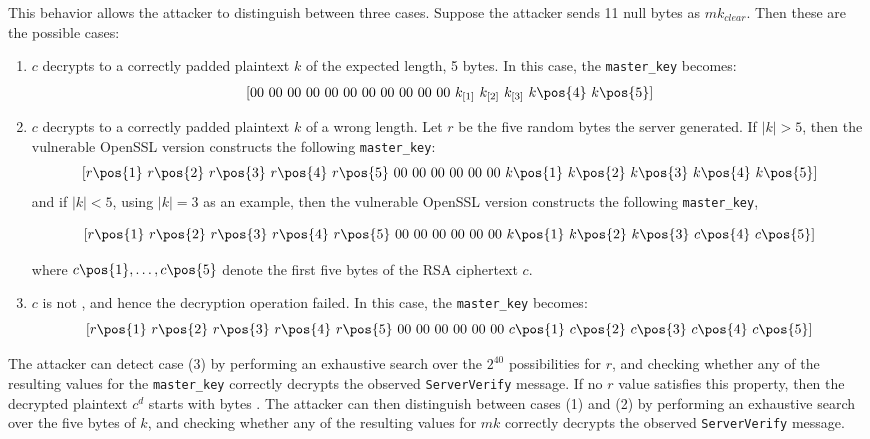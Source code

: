 This behavior allows the attacker to distinguish between three cases.
Suppose the attacker sends 11 null bytes as $mk_{clear}$.
Then these are the possible cases:
\begin{enumerate}
	\item $c$ decrypts to a correctly padded plaintext $k$ of the expected length, 5 bytes.
		In this case, the \texttt{master\_key} becomes:
		$$[00\ 00\ 00\ 00\ 00\ 00\ 00\ 00\ 00\ 00\ 00\ k_{[1]}\ k_{[2]}\ k_{[3]}\ k\pos{4}\ k\pos{5}]$$
	\item $c$ decrypts to a correctly padded plaintext $k$ of a wrong length.
		Let $r$ be the five random bytes the server generated.
		If $|k| > 5$,
		then the vulnerable OpenSSL version constructs the following \texttt{master\_key}:
		$$[r\pos{1}\ r\pos{2}\ r\pos{3}\ r\pos{4}\ r\pos{5}\ 00\ 00\ 00\ 00\ 00\ 00\ k\pos{1}\ k\pos{2}\ k\pos{3}\ k\pos{4}\ k\pos{5}]$$
		and if $|k| < 5$, using $|k| = 3$ as an example,
		then the vulnerable OpenSSL version constructs the following \texttt{master\_key},


		$$[r\pos{1}\ r\pos{2}\ r\pos{3}\ r\pos{4}\ r\pos{5}\ 00\ 00\ 00\ 00\ 00\ 00\ k\pos{1}\ k\pos{2}\ k\pos{3}\ c\pos{4}\ c\pos{5}]$$

		where $c\pos{1}, \ldots, c\pos{5}$ denote the first five bytes of the RSA ciphertext $c$.
	\item $c$ is not \sslconform,
		and hence the decryption operation failed. In this case, the \texttt{master\_key} becomes:
		$$[r\pos{1}\ r\pos{2}\ r\pos{3}\ r\pos{4}\ r\pos{5}\ 00\ 00\ 00\ 00\ 00\ 00\ c\pos{1}\ c\pos{2}\ c\pos{3}\ c\pos{4}\ c\pos{5}]$$
\end{enumerate}

The attacker can detect case (3) by performing an exhaustive search over the $2^{40}$ possibilities for $r$,
and checking whether any of the resulting values for the \texttt{master\_key} correctly 
decrypts the observed \texttt{ServerVerify} message.
If no $r$ value satisfies this property, then
the decrypted plaintext $c^d$ starts with bytes .
The attacker can then distinguish between cases (1) and (2) by 
performing an exhaustive search over the five bytes of $k$,
and checking whether any of the resulting values for $mk$ correctly 
decrypts the observed \texttt{ServerVerify} message.

